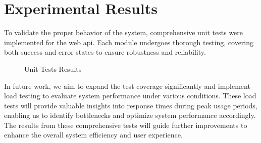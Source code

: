 \chapter{Experimental Results}
\label{cap:experimental_results}

To validate the proper behavior of the system, comprehensive unit tests were implemented for the web \acs{api}. Each module undergoes thorough testing, covering both success and error states to ensure robustness and reliability.

\begin{figure}[H]
\centering
{}
\caption{Unit Tests Results}
\label{fig:unit_tests}
\end{figure}

In future work, we aim to expand the test coverage significantly and implement load testing to evaluate system performance under various conditions. These load tests will provide valuable insights into response times during peak usage periods, enabling us to identify bottlenecks and optimize system performance accordingly. The results from these comprehensive tests will guide further improvements to enhance the overall system efficiency and user experience.